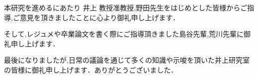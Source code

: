 \theacknowledgments

本研究を進めるにあたり 井上 教授准教授,野田先生をはじめとした皆様からご指導,ご意見を頂きましたことに心より御礼申し上げます．

そして,レジュメや卒業論文を書く際にご指導頂きました島谷先輩,荒川先輩に御礼申し上げます．

最後になりましたが,日常の議論を通じて多くの知識や示唆を頂いた井上研究室の皆様に御礼申し上げます．ありがとうございました．
